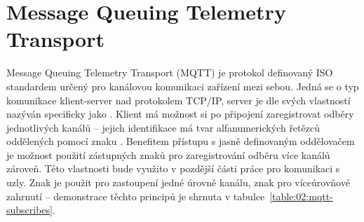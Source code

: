 \section{Message Queuing Telemetry Transport}
Message Queuing Telemetry Transport (MQTT) je protokol definovaný ISO standardem určený pro kanálovou komunikaci zařízení
mezi sebou. Jedná se o typ komunikace klient-server nad protokolem TCP/IP, server je dle svých vlastností nazýván specificky
jako . Klient má možnost si po připojení zaregistrovat odběry jednotlivých kanálů -- jejich identifikace má tvar
alfanumerických řetězců oddělených pomocí znaku \uv{/}. Benefitem přístupu s jasně definovaným oddělovačem je možnost použití zástupných znaků pro
zaregistrování odběru více kanálů zároveň. Této vlastnosti bude využito v pozdější části práce pro komunikaci s uzly. Znak \uv{+}
je použit pro zastoupení jedné úrovně kanálu, znak \uv{\#} pro víceúrovňové zahrnutí -- demonstrace těchto principů je shrnuta v
tabulce~\ref{table:02:mqtt-subscribes}.

